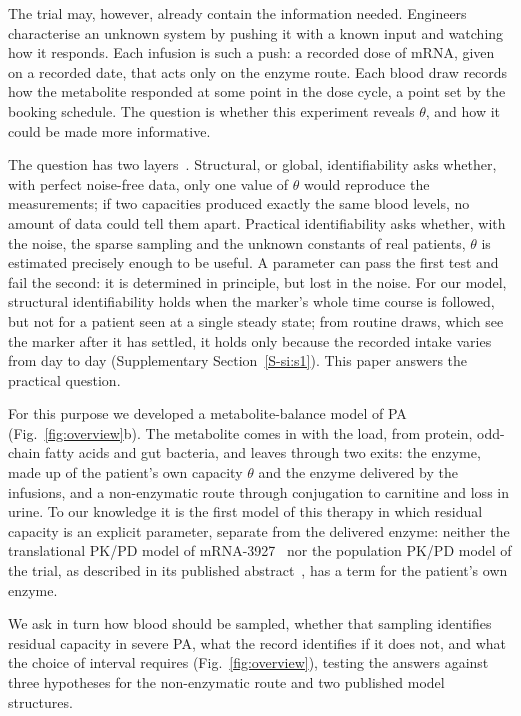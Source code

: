 \documentclass[11pt]{article}
\begin{document}
The trial may, however, already contain the information needed. Engineers characterise an unknown system by
pushing it with a known input and watching how it responds. Each infusion is such a push: a
recorded dose of mRNA, given on a recorded date, that acts only on the enzyme route. Each blood
draw records how the metabolite responded at some point in the dose cycle, a point set by the
booking schedule. The question is whether this experiment reveals $\theta$, and how it could
be made more informative.

The question has two layers~\cite{profile_likelihood,nlme_identifiability}. Structural, or global,
identifiability asks whether, with perfect noise-free data, only one value of $\theta$ would
reproduce the measurements; if two capacities produced exactly the same blood levels, no amount
of data could tell them apart. Practical identifiability asks whether, with the noise, the sparse
sampling and the unknown constants of real patients, $\theta$ is estimated precisely enough to be
useful. A parameter can pass the first test and fail the second: it is determined in principle,
but lost in the noise. For our model, structural identifiability holds when the marker's whole
time course is followed, but not for a patient seen at a single steady state; from routine draws,
which see the marker after it has settled, it holds only because the recorded intake varies from
day to day (Supplementary Section~\ref{S-si:s1}). This paper answers the practical question.

For this purpose we developed a metabolite-balance model of PA (Fig.~\ref{fig:overview}b). The
metabolite comes in with the load, from protein, odd-chain fatty acids and gut bacteria, and
leaves through two exits: the enzyme, made up of the patient's own capacity $\theta$ and the enzyme
delivered by the infusions, and a non-enzymatic route through conjugation to carnitine and loss in
urine. To our knowledge it is the first model of this therapy in which residual capacity is an
explicit parameter, separate from the delivered enzyme: neither the translational PK/PD model of
mRNA-3927~\cite{pkpd_translational} nor the population PK/PD model of the trial, as described in
its published abstract~\cite{gao2025acop}, has a term for the patient's own enzyme.

We ask in turn how blood should be sampled, whether that sampling identifies residual capacity in
severe PA, what the record identifies if it does not, and what the choice of interval requires
(Fig.~\ref{fig:overview}), testing the answers against three hypotheses for the non-enzymatic route
and two published model structures.
\end{document}
